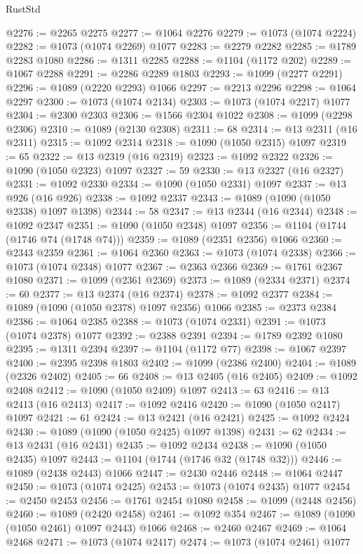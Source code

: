 \begin{lexlean}{RustStd}
\begin{coremodule}
@2276 := @2265 @2275
@2277 := @1064 @2276
@2279 := @1073 (@1074 @2224)
@2282 := @1073 (@1074 @2269) @1077
@2283 := @2279 @2282
@2285 := @1789 @2283 @1080
@2286 := @1311 @2285
@2288 := @1104 (@1172 @202)
@2289 := @1067 @2288
@2291 := @2286 @2289 @1803
@2293 := @1099 (@2277 @2291)
@2296 := @1089 (@2220 @2293) @1066
@2297 := @2213 @2296
@2298 := @1064 @2297
@2300 := @1073 (@1074 @2134)
@2303 := @1073 (@1074 @2217) @1077
@2304 := @2300 @2303
@2306 := @1566 @2304 @1022
@2308 := @1099 (@2298 @2306)
@2310 := @1089 (@2130 @2308)
@2311 := 68
@2314 := @13 @2311 (@16 @2311)
@2315 := @1092 @2314
@2318 := @1090 (@1050 @2315) @1097
@2319 := 65
@2322 := @13 @2319 (@16 @2319)
@2323 := @1092 @2322
@2326 := @1090 (@1050 @2323) @1097
@2327 := 59
@2330 := @13 @2327 (@16 @2327)
@2331 := @1092 @2330
@2334 := @1090 (@1050 @2331) @1097
@2337 := @13 @926 (@16 @926)
@2338 := @1092 @2337
@2343 := @1089 (@1090 (@1050 @2338) @1097 @1398)
@2344 := 58
@2347 := @13 @2344 (@16 @2344)
@2348 := @1092 @2347
@2351 := @1090 (@1050 @2348) @1097
@2356 := @1104 (@1744 (@1746 @74 (@1748 @74)))
@2359 := @1089 (@2351 @2356) @1066
@2360 := @2343 @2359
@2361 := @1064 @2360
@2363 := @1073 (@1074 @2338)
@2366 := @1073 (@1074 @2348) @1077
@2367 := @2363 @2366
@2369 := @1761 @2367 @1080
@2371 := @1099 (@2361 @2369)
@2373 := @1089 (@2334 @2371)
@2374 := 60
@2377 := @13 @2374 (@16 @2374)
@2378 := @1092 @2377
@2384 := @1089 (@1090 (@1050 @2378) @1097 @2356) @1066
@2385 := @2373 @2384
@2386 := @1064 @2385
@2388 := @1073 (@1074 @2331)
@2391 := @1073 (@1074 @2378) @1077
@2392 := @2388 @2391
@2394 := @1789 @2392 @1080
@2395 := @1311 @2394
@2397 := @1104 (@1172 @77)
@2398 := @1067 @2397
@2400 := @2395 @2398 @1803
@2402 := @1099 (@2386 @2400)
@2404 := @1089 (@2326 @2402)
@2405 := 66
@2408 := @13 @2405 (@16 @2405)
@2409 := @1092 @2408
@2412 := @1090 (@1050 @2409) @1097
@2413 := 63
@2416 := @13 @2413 (@16 @2413)
@2417 := @1092 @2416
@2420 := @1090 (@1050 @2417) @1097
@2421 := 61
@2424 := @13 @2421 (@16 @2421)
@2425 := @1092 @2424
@2430 := @1089 (@1090 (@1050 @2425) @1097 @1398)
@2431 := 62
@2434 := @13 @2431 (@16 @2431)
@2435 := @1092 @2434
@2438 := @1090 (@1050 @2435) @1097
@2443 := @1104 (@1744 (@1746 @32 (@1748 @32)))
@2446 := @1089 (@2438 @2443) @1066
@2447 := @2430 @2446
@2448 := @1064 @2447
@2450 := @1073 (@1074 @2425)
@2453 := @1073 (@1074 @2435) @1077
@2454 := @2450 @2453
@2456 := @1761 @2454 @1080
@2458 := @1099 (@2448 @2456)
@2460 := @1089 (@2420 @2458)
@2461 := @1092 @354
@2467 := @1089 (@1090 (@1050 @2461) @1097 @2443) @1066
@2468 := @2460 @2467
@2469 := @1064 @2468
@2471 := @1073 (@1074 @2417)
@2474 := @1073 (@1074 @2461) @1077

\end{coremodule}
\end{lexlean}
